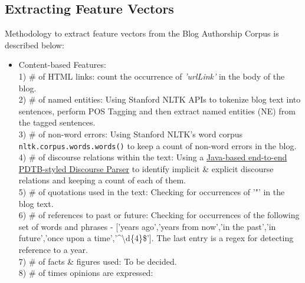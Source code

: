 \documentclass{sig-alternate}
\begin{document}
\subsection{Extracting Feature Vectors}
Methodology to extract feature vectors from the Blog Authorship Corpus is described below:
\begin{itemize}
\item Content-based Features:\\
1) \# of HTML links: count the occurrence of \textit{'urlLink'} in the body of the blog.\\
2) \# of named entities: Using Stanford NLTK APIs to tokenize blog text into sentences, perform POS Tagging and then extract named entities (NE) from the tagged sentences.\\
3) \# of non-word errors: Using Stanford NLTK's word corpus \texttt{nltk.corpus.words.words()} to keep a count of non-word errors in the blog.\\
4) \# of discourse relations within the text: Using a \href{https://github.com/ilija139/PDTB-Parser}{Java-based end-to-end PDTB-styled Discourse Parser} to identify implicit \& explicit discourse relations and keeping a count of each of them.\\
5) \# of quotations used in the text: Checking for occurrences of '"' in the blog text.\\
6) \# of references to past or future: Checking for occurrences of the following set of words and phrases - ['years ago','years from now','in the past','in future','once upon a time','\textasciicircum \textbackslash d\{4\}\$']. The last entry is a regex for detecting reference to a year.\\
7) \# of facts \& figures used: To be decided.\\
8) \# of times opinions are expressed: 
\end{itemize}
\end{document}
